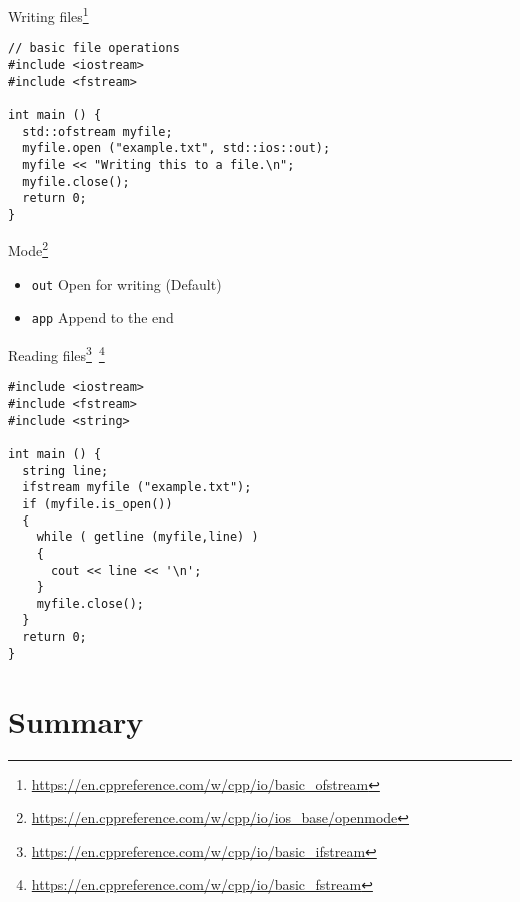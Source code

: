 \documentclass[12pt,t]{beamer}
\begin{document}
\begin{frame}[fragile]{Writing files\footnote{\tiny\url{https://en.cppreference.com/w/cpp/io/basic_ofstream}}}

\begin{lstlisting}
// basic file operations
#include <iostream>
#include <fstream>

int main () {
  std::ofstream myfile;
  myfile.open ("example.txt", std::ios::out);
  myfile << "Writing this to a file.\n";
  myfile.close();
  return 0;
}
\end{lstlisting}

\begin{block}{Mode\footnote{\tiny\url{https://en.cppreference.com/w/cpp/io/ios_base/openmode}}}
\begin{itemize}
\item \lstinline|out| Open for writing (Default)
\item \lstinline|app| Append to the end 
\end{itemize}

\end{block}

\end{frame}

\begin{frame}[fragile]{Reading files\footnote{\tiny\url{https://en.cppreference.com/w/cpp/io/basic_ifstream}}~\footnote{\tiny\url{https://en.cppreference.com/w/cpp/io/basic_fstream}}}

\begin{lstlisting}
#include <iostream>
#include <fstream>
#include <string>

int main () {
  string line;
  ifstream myfile ("example.txt");
  if (myfile.is_open())
  {
    while ( getline (myfile,line) )
    {
      cout << line << '\n';
    }
    myfile.close();
  }
  return 0;
}
\end{lstlisting}


\end{frame}

\section{Summary}
\end{document}
